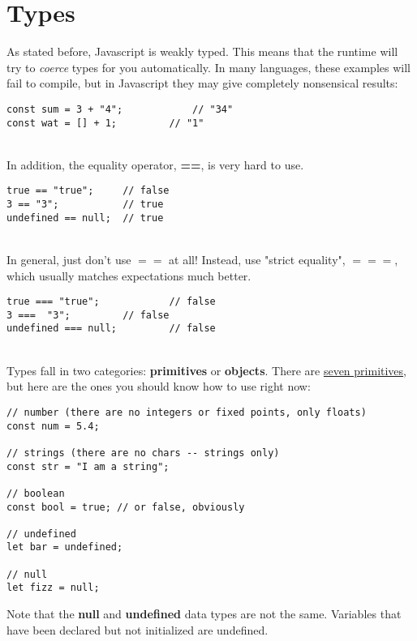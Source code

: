 \documentclass{article}
\begin{document}
\section{Types}

As stated before, Javascript is weakly typed. This means that the runtime will try to \textit{coerce} types for you automatically. In many languages, these examples will fail to compile, but in Javascript they may give completely nonsensical results:

\begin{lstlisting}
const sum = 3 + "4";			// "34"
const wat = [] + 1;			// "1"
\end{lstlisting}

\noindent
\\
In addition, the equality operator, \textbf{==}, is very hard to use.

\begin{lstlisting}
true == "true";		// false
3 == "3";			// true
undefined == null; 	// true
\end{lstlisting}

\noindent
\\
In general, just don't use $==$ at all! Instead, use "strict equality", $===$, which usually matches expectations much better.

\begin{lstlisting}
true === "true";			// false
3 ===  "3";			// false
undefined === null; 		// false
\end{lstlisting}

\noindent
\\
Types fall in two categories: \textbf{primitives} or \textbf{objects}. There are \href{https://developer.mozilla.org/en-US/docs/Web/JavaScript/Language_overview#data_types}{seven primitives}, but here are the ones you should know how to use right now:
\begin{lstlisting}
// number (there are no integers or fixed points, only floats)
const num = 5.4;

// strings (there are no chars -- strings only)
const str = "I am a string";

// boolean
const bool = true; // or false, obviously

// undefined
let bar = undefined;

// null
let fizz = null;
\end{lstlisting}

\noindent
Note that the \textbf{null} and \textbf{undefined} data types are not the same. Variables that have been declared but not initialized are undefined.
\end{document}
